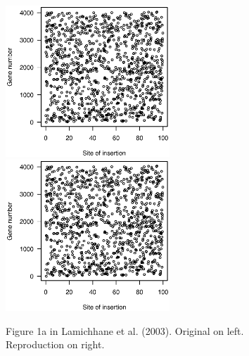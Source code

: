 \begin{figure}
\includegraphics[viewport=133 224 464 528, width=0.55\textwidth]{../original/Nov02/R/Figs/fig1.ps}
\hfill
\includegraphics[viewport=133 224 464 528, width=0.55\textwidth]{../reproduction/Figs/fig1.ps}

\caption{Figure 1a in Lamichhane et al. (2003). Original on left. Reproduction on right.}
\end{figure}

